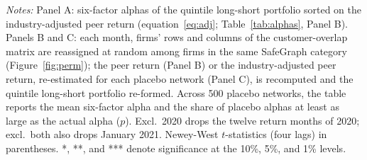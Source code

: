 \begin{table}[!htbp]
\par\vspace{4pt}\begin{minipage}{\linewidth}\scriptsize \emph{Notes:} Panel A: six-factor alphas of the quintile long-short portfolio sorted on the industry-adjusted peer return (equation~\eqref{eq:adj}; Table~\ref{tab:alphas}, Panel B). Panels B and C: each month, firms' rows and columns of the customer-overlap matrix are reassigned at random among firms in the same SafeGraph category (Figure~\ref{fig:perm}); the peer return (Panel B) or the industry-adjusted peer return, re-estimated for each placebo network (Panel C), is recomputed and the quintile long-short portfolio re-formed. Across 500 placebo networks, the table reports the mean six-factor alpha and the share of placebo alphas at least as large as the actual alpha ($p$). Excl.\ 2020 drops the twelve return months of 2020; excl.\ both also drops January 2021. Newey-West $t$-statistics (four lags) in parentheses. *, **, and *** denote significance at the 10\%, 5\%, and 1\% levels.\end{minipage}
\end{table}